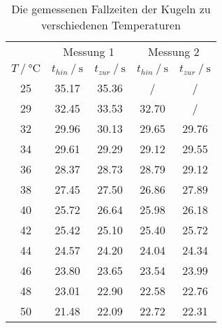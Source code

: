 \begin{table}
    \centering
    \caption{Die gemessenen Fallzeiten der Kugeln zu verschiedenen Temperaturen}
    \begin{tabular}{ccccc}
      \toprule
      & \multicolumn{2}{c}{Messung 1} &\multicolumn{2}{c}{Messung 2} \\
      \cmidrule(lr){2-3} \cmidrule(lr){4-5}
      {$T \mathbin{/} \unit{\celsius}$} &
      {$t_{hin} \mathbin{/} \unit{\second}$} &
      {$t_{zur} \mathbin{/} \unit{\second}$} &
      {$t_{hin} \mathbin{/} \unit{\second}$} &
      {$t_{zur} \mathbin{/} \unit{\second}$} \\
      \midrule
      25 & 35.17 & 35.36 & /     & /     \\
      29 & 32.45 & 33.53 & 32.70 & /     \\
      32 & 29.96 & 30.13 & 29.65 & 29.76 \\
      34 & 29.61 & 29.29 & 29.12 & 29.55 \\
      36 & 28.37 & 28.73 & 28.79 & 29.12 \\
      38 & 27.45 & 27.50 & 26.86 & 27.89 \\
      40 & 25.72 & 26.64 & 25.98 & 26.18 \\
      42 & 25.42 & 25.10 & 25.40 & 25.72 \\
      44 & 24.57 & 24.20 & 24.04 & 24.34 \\
      46 & 23.80 & 23.65 & 23.54 & 23.99 \\
      48 & 23.01 & 22.90 & 22.58 & 22.76 \\
      50 & 21.48 & 22.09 & 22.72 & 22.31 \\
      \bottomrule
    \end{tabular}
    \label{tab:Tabelle2}
  \end{table}
